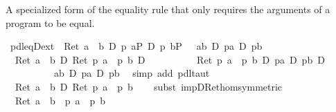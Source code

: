 \begin{isabellebody}
\isamarkupfalse%
\isamarkupfalse%
%
\begin{isamarkuptext}%
A specialized form of the equality rule  that only requires the arguments
  of a program  to be equal.%
\end{isamarkuptext}%
\isamarkuptrue%
\ pdl{\isacharunderscore}eqD{\isacharunderscore}ext{\isacharcolon}\ {\isachardoublequote}{\isasymturnstile}\ Ret\ {\isacharparenleft}a\ {\isacharequal}\ b{\isacharparenright}\ {\isasymlongrightarrow}\isactrlsub D\ {\isasymlangle}p\ a{\isasymrangle}P\ {\isasymlongrightarrow}\isactrlsub D\ {\isasymlangle}p\ b{\isasymrangle}P{\isachardoublequote}\ {\isacharparenleft}\ {\isachardoublequote}{\isasymturnstile}\ {\isacharquery}ab\ {\isasymlongrightarrow}\isactrlsub D\ {\isacharquery}pa\ {\isasymlongrightarrow}\isactrlsub D\ {\isacharquery}pb{\isachardoublequote}{\isacharparenright}\isanewline
\isamarkupfalse%
\ {\isacharminus}\isanewline
\ \ \isamarkupfalse%
\ {\isachardoublequote}{\isasymturnstile}\ {\isacharparenleft}Ret\ {\isacharparenleft}a\ {\isacharequal}\ b{\isacharparenright}\ {\isasymlongrightarrow}\isactrlsub D\ Ret\ {\isacharparenleft}p\ a\ {\isacharequal}\ p\ b{\isacharparenright}{\isacharparenright}\ {\isasymlongrightarrow}\isactrlsub D\isanewline
\ \ \ \ \ \ \ \ \ \ {\isacharparenleft}Ret\ {\isacharparenleft}p\ a\ {\isacharequal}\ p\ b{\isacharparenright}\ {\isasymlongrightarrow}\isactrlsub D\ {\isacharquery}pa\ {\isasymlongrightarrow}\isactrlsub D\ {\isacharquery}pb{\isacharparenright}\ {\isasymlongrightarrow}\isactrlsub D\isanewline
\ \ \ \ \ \ \ \ \ \ {\isacharparenleft}{\isacharquery}ab\ {\isasymlongrightarrow}\isactrlsub D\ {\isacharquery}pa\ {\isasymlongrightarrow}\isactrlsub D\ {\isacharquery}pb{\isacharparenright}{\isachardoublequote}\ \isamarkupfalse%
\ {\isacharparenleft}simp\ add{\isacharcolon}\ pdl{\isacharunderscore}taut{\isacharparenright}\isanewline
\ \ \isamarkupfalse%
\ \isanewline
\ \ \isamarkupfalse%
\ {\isachardoublequote}{\isasymturnstile}\ Ret\ {\isacharparenleft}a\ {\isacharequal}\ b{\isacharparenright}\ {\isasymlongrightarrow}\isactrlsub D\ Ret\ {\isacharparenleft}p\ a\ {\isacharequal}\ p\ b{\isacharparenright}{\isachardoublequote}\isanewline
\ \ \isamarkupfalse%
\ {\isacharparenleft}subst\ impD{\isacharunderscore}Ret{\isacharunderscore}hom{\isacharbrackleft}symmetric{\isacharbrackright}{\isacharparenright}\isanewline
\ \ \ \ \isamarkupfalse%
\ {\isachardoublequote}{\isasymturnstile}\ Ret\ {\isacharparenleft}a\ {\isacharequal}\ b\ {\isasymlongrightarrow}\ p\ a\ {\isacharequal}\ p\ b{\isacharparenright}{\isachardoublequote}\isanewline

\end{isabellebody}
